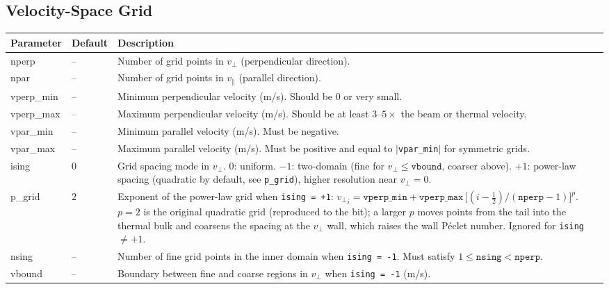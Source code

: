 \documentclass[11pt,a4paper]{article}
\newcommand{\vp}{v_\perp}
\newcommand{\vpa}{v_\parallel}
\begin{document}
\subsection{Velocity-Space Grid}

\begin{longtable}{>{\ttfamily}p{3.2cm} p{1.5cm} p{9cm}}
\toprule
\normalfont Parameter & Default & Description \\
\midrule
\endhead
\bottomrule
\endlastfoot

nperp & -- &
  Number of grid points in $\vp$ (perpendicular direction). \\[4pt]

npar & -- &
  Number of grid points in $\vpa$ (parallel direction). \\[4pt]

vperp\_min & -- &
  Minimum perpendicular velocity (m/s).  Should be 0 or very small. \\[4pt]

vperp\_max & -- &
  Maximum perpendicular velocity (m/s).  Should be at least $3$--$5\times$
  the beam or thermal velocity. \\[4pt]

vpar\_min & -- &
  Minimum parallel velocity (m/s).  Must be negative. \\[4pt]

vpar\_max & -- &
  Maximum parallel velocity (m/s).  Must be positive and equal to
  $|$\texttt{vpar\_min}$|$ for symmetric grids. \\[4pt]

ising & $0$ &
  Grid spacing mode in $\vp$.
  $0$: uniform.
  $-1$: two-domain (fine for $\vp \le \texttt{vbound}$, coarser above).
  $+1$: power-law spacing (quadratic by default, see \texttt{p\_grid}), higher
  resolution near $\vp = 0$. \\[4pt]

p\_grid & $2$ &
  Exponent of the power-law grid when \texttt{ising = +1}:
  ${\vp}_i = \texttt{vperp\_min} + \texttt{vperp\_max}\,
  \bigl[(i-\tfrac12)/(\texttt{nperp}-1)\bigr]^{p}$.
  $p = 2$ is the original quadratic grid (reproduced to the bit); a larger
  $p$ moves points from the tail into the thermal bulk and coarsens the
  spacing at the $\vp$ wall, which raises the wall P\'eclet number.
  Ignored for \texttt{ising} $\ne +1$. \\[4pt]

nsing & -- &
  Number of fine grid points in the inner domain when \texttt{ising = -1}.
  Must satisfy $1 \le \texttt{nsing} < \texttt{nperp}$. \\[4pt]

vbound & -- &
  Boundary between fine and coarse regions in $\vp$ when \texttt{ising = -1}
  (m/s). \\[4pt]

\end{longtable}
\end{document}
